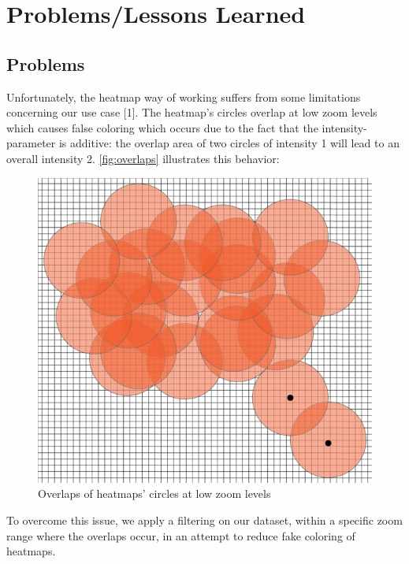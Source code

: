 \documentclass[10pt,a4paper]{article} %
\begin{document}
    

    
    

    \section{Problems/Lessons Learned}
	\subsection{Problems}

	Unfortunately, the heatmap way of working suffers from some limitations concerning our use case [1]. The heatmap's circles overlap at low zoom levels which causes false coloring which occurs due to the fact that the intensity-parameter is additive: the overlap area of two circles of intensity 1 will lead to an overall intensity 2. \autoref{fig:overlaps} illustrates this behavior:
    
    \begin{figure}[H]
    \centering
	   
       \includegraphics[scale =0.4]{pic6}
    \caption{Overlaps of heatmaps' circles at low zoom levels}
		  \label{fig:overlaps}
       
    \end{figure}
    \noindent
    To overcome this issue, we apply a filtering on our dataset, within a specific zoom range where the overlaps occur, in an attempt to reduce fake coloring of heatmaps.
\end{document}
